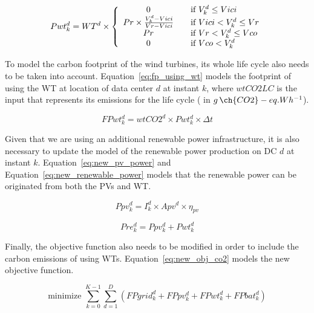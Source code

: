 \begin{equation} \label{eq:wt_power_prod}
Pwt^d_{k} = WT^d \times \left\{ 
  \begin{array}{ c l }
    0   & \quad \textrm{if } V^d_k \leq Vici \\
    Pr \times \frac{V^d_k - Vici}{Vr - Vici}  & \quad \textrm{if } Vici < V^d_k \leq Vr \\
    Pr  & \quad \textrm{if } Vr < V^d_k \leq Vco \\
    0  & \quad \textrm{if } Vco < V^d_k \\
  \end{array}
\right.
\end{equation}


To model the carbon footprint of the wind turbines, its whole life cycle also needs to be taken into account. Equation~\eqref{eq:fp_using_wt} models the footprint of using the WT at location of data center $d$ at instant $k$, where $wtCO2LC$ is the input that represents its emissions for the life cycle ( in $g\,\ch{CO2}-eq.Wh^{-1}$).

\begin{equation}\label{eq:fp_using_wt}
   FPwt^d_k =  wtCO2^d \times Pwt^d_{k}\times \Delta t
\end{equation}

Given that we are using an additional renewable power infrastructure, it is also necessary to update the model of the renewable power production on DC $d$ at instant $k$. Equation~\eqref{eq:new_pv_power} and Equation~\eqref{eq:new_renewable_power} models that the renewable power can be originated from both the PVs and WT.

\begin{equation} \label{eq:new_pv_power}
    Ppv^d_{k}= I^d_k \times Apv^d \times \eta_{pv}
\end{equation}

\begin{equation} \label{eq:new_renewable_power}
    Pre^d_{k}= Ppv^d_{k} + Pwt^d_{k}
\end{equation}

Finally, the objective function also needs to be modified in order to include the carbon emissions of using WTs. Equation~\ref{eq:new_obj_co2} models the new objective function.

\begin{equation} \label{eq:new_obj_co2}
  \text{minimize }\sum_{k=0}^{K-1} \sum_{d=1}^D ( FPgrid^d_k +  FPpv^d_k +  FPwt^d_k + FPbat^d_k) 
\end{equation}

